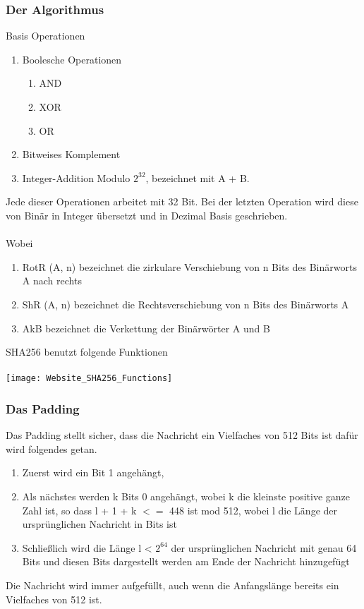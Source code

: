 {\subsubsection{Der Algorithmus}
Basis Operationen
\begin{enumerate}
\item Boolesche Operationen
\begin{enumerate}
\item AND
\item XOR
\item OR
\end{enumerate}
\item Bitweises Komplement
\item Integer-Addition Modulo $2^{32}$, bezeichnet mit A + B.
\end{enumerate}
Jede dieser Operationen arbeitet mit 32 Bit. Bei der letzten Operation wird diese von Binär in Integer übersetzt und in Dezimal Basis geschrieben.\\ \\
Wobei
\begin{enumerate}
\item RotR (A, n) bezeichnet die zirkulare Verschiebung von n Bits des Binärworts A nach rechts
\item ShR (A, n) bezeichnet die Rechtsverschiebung von n Bits des Binärworts A
\item AkB bezeichnet die Verkettung der Binärwörter A und B
\end{enumerate}
SHA256 benutzt folgende Funktionen \\ \\

\texttt{[image: Website\_SHA256\_Functions]}
\subsubsection{Das Padding}
Das Padding stellt sicher, dass die Nachricht ein Vielfaches von 512 Bits ist dafür wird folgendes getan.
\begin{enumerate}
\item Zuerst wird ein Bit 1 angehängt,
\item Als nächstes werden k Bits 0 angehängt, wobei k die kleinste positive ganze Zahl ist, so dass l + 1 + k $<=$ 448 ist
mod 512, wobei l die Länge der ursprünglichen Nachricht in Bits ist
\item Schließlich wird die Länge l < $2^{64}$ der ursprünglichen Nachricht mit genau 64 Bits und diesen Bits dargestellt
werden am Ende der Nachricht hinzugefügt
\end{enumerate}
Die Nachricht wird immer aufgefüllt, auch wenn die Anfangslänge bereits ein Vielfaches von 512 ist.
}
